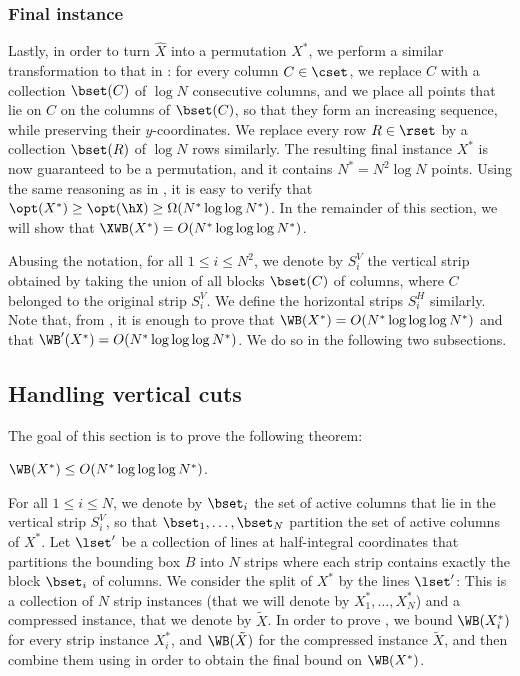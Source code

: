 \subsubsection{Final instance}


Lastly, in order to turn $\hat X$ into a permutation $X^*$, we perform a similar transformation to that in : for every column $C\in \cset$, we replace $C$ with a collection $\bset(C)$ of $\log N$ consecutive columns, and we place all points that lie on $C$ on the columns of $\bset(C)$, so that they form an increasing sequence, while preserving their $y$-coordinates. We replace every row $R\in \rset$ by a collection $\bset(R)$ of $\log N$ rows similarly. The resulting final instance $X^*$ is now guaranteed to be a permutation, and it contains $N^*=N^2\log N$ points. Using the same reasoning as in , it is easy to verify that $\opt(X^*)\geq \opt(\hX)\geq \Omega(N^*\log\log N^*)$. In the remainder of this section, we will show that $\XWB(X^*)=O(N^*\log\log \log N^*)$. 

Abusing the notation, for all $1\leq i\leq N^2$, we denote by $S^V_i$ the vertical strip obtained by taking the union of all blocks $\bset(C)$ of columns, where $C$ belonged to the original strip $S^V_i$. We define the horizontal strips $S^H_i$ similarly. Note that, from , it is enough to prove that $\WB(X^*)=O(N^*\log\log \log N^*)$ and that  $\WB'(X^*)=O(N^*\log\log \log N^*)$. We do so in the following two subsections.


%
%
%
%
\subsection{Handling vertical cuts}\label{subsec: bounding WB vertical}
%
%
%
%
The goal of this section is to prove the following theorem:

\begin{theorem}\label{thm: boundinb WB vertical}
	$\WB(X^*)\leq O(N^*\log\log\log N^*)$.
\end{theorem}

For all $1\leq i\leq N$, we denote by $\bset_i$ the set of active columns that lie in the vertical strip $S^V_i$, so that $\bset_1,\ldots,\bset_N$ partition the set of active columns of $X^*$.
Let $\lset'$ be a collection of lines at half-integral coordinates that partitions the bounding box $B$ into $N$ strips where each strip contains exactly the block $\bset_i$ of columns. 
We consider the split of $X^*$ by the lines $\lset'$: This is a collection of $N$ strip instances (that we will denote by $X^*_1,\ldots,X^*_N$) and a compressed instance, that we denote by $\tilde X$.     
%
%
In order to prove , we bound $\WB(X^*_i)$ for every strip instance $X^*_i$, and $\WB(\tilde X)$ for the compressed instance $\tilde X$, and then combine them using  in order to obtain the final bound on $\WB(X^*)$.


